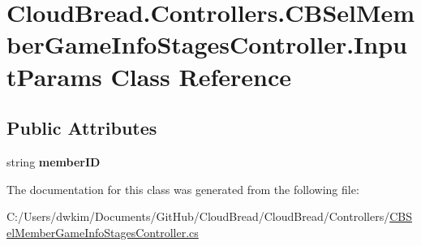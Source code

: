 \hypertarget{a00096}{}\section{Cloud\+Bread.\+Controllers.\+C\+B\+Sel\+Member\+Game\+Info\+Stages\+Controller.\+Input\+Params Class Reference}
\label{a00096}
\subsection*{Public Attributes}
\begin{DoxyCompactItemize}
\item 
string {\bfseries member\+ID}\hypertarget{a00096_a591a11a0c69188fdf44a4aaf9c4d7562}{}\label{a00096_a591a11a0c69188fdf44a4aaf9c4d7562}

\end{DoxyCompactItemize}


The documentation for this class was generated from the following file\+:\begin{DoxyCompactItemize}
\item 
C\+:/\+Users/dwkim/\+Documents/\+Git\+Hub/\+Cloud\+Bread/\+Cloud\+Bread/\+Controllers/\hyperlink{a00223}{C\+B\+Sel\+Member\+Game\+Info\+Stages\+Controller.\+cs}\end{DoxyCompactItemize}
